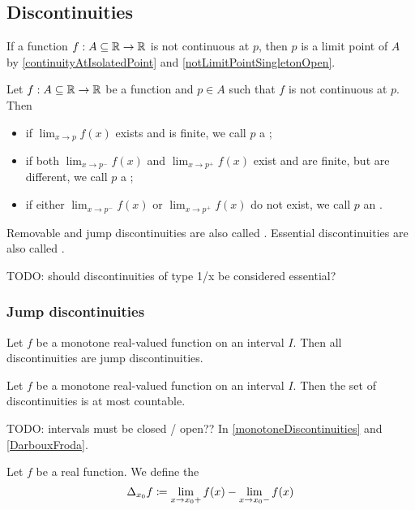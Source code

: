 \subsection{Discontinuities}
If a function $f:A\subseteq\mathbb{R}\to\mathbb{R}$ is not continuous at $p$, then $p$ is a limit point of $A$ by \ref{continuityAtIsolatedPoint} and \ref{notLimitPointSingletonOpen}.
\begin{definition}
Let $f:A\subseteq\mathbb{R}\to\mathbb{R}$ be a function and $p\in A$ such that $f$ is not continuous at $p$. Then
\begin{itemize}
\item if $\lim_{x\to p}f(x)$ exists and is finite, we call $p$ a ;
\item if both $\lim_{x\to p^-}f(x)$ and $\lim_{x\to p^+}f(x)$ exist and are finite, but are different, we call $p$ a ;
\item if either $\lim_{x\to p^-}f(x)$ or $\lim_{x\to p^+}f(x)$ do not exist, we call $p$ an .
\end{itemize}
Removable and jump discontinuities are also called . Essential discontinuities are also called .
\end{definition}
TODO: should discontinuities of type 1/x be considered essential?

\subsubsection{Jump discontinuities}
\begin{proposition} \label{monotoneDiscontinuities}
Let $f$ be a monotone real-valued function on an interval $I$. Then all discontinuities are jump discontinuities.
\end{proposition}
\begin{theorem} \label{DarbouxFroda}
Let $f$ be a monotone real-valued function on an interval $I$. Then the set of discontinuities is at most countable.
\end{theorem}

TODO: intervals must be closed / open?? In \ref{monotoneDiscontinuities} and \ref{DarbouxFroda}.


\begin{definition}
Let $f$ be a real function. We define the 
\[ \Delta_{x_0}f \coloneqq \lim_{x\to x_0+} f(x) - \lim_{x\to x_0-} f(x) \]
\end{definition}

